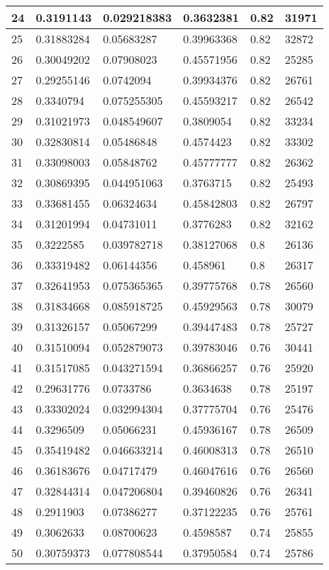\begin{longtable}{|l|l|l|l|l|l|}
24 & 0.3191143 & 0.029218383 & 0.3632381 & 0.82 & 31971 \\ \hline 
25 & 0.31883284 & 0.05683287 & 0.39963368 & 0.82 & 32872 \\ \hline 
26 & 0.30049202 & 0.07908023 & 0.45571956 & 0.82 & 25285 \\ \hline 
27 & 0.29255146 & 0.0742094 & 0.39934376 & 0.82 & 26761 \\ \hline 
28 & 0.3340794 & 0.075255305 & 0.45593217 & 0.82 & 26542 \\ \hline 
29 & 0.31021973 & 0.048549607 & 0.3809054 & 0.82 & 33234 \\ \hline 
30 & 0.32830814 & 0.05486848 & 0.4574423 & 0.82 & 33302 \\ \hline 
31 & 0.33098003 & 0.05848762 & 0.45777777 & 0.82 & 26362 \\ \hline 
32 & 0.30869395 & 0.044951063 & 0.3763715 & 0.82 & 25493 \\ \hline 
33 & 0.33681455 & 0.06324634 & 0.45842803 & 0.82 & 26797 \\ \hline 
34 & 0.31201994 & 0.04731011 & 0.3776283 & 0.82 & 32162 \\ \hline 
35 & 0.3222585 & 0.039782718 & 0.38127068 & 0.8 & 26136 \\ \hline 
36 & 0.33319482 & 0.06144356 & 0.458961 & 0.8 & 26317 \\ \hline 
37 & 0.32641953 & 0.075365365 & 0.39775768 & 0.78 & 26560 \\ \hline 
38 & 0.31834668 & 0.085918725 & 0.45929563 & 0.78 & 30079 \\ \hline 
39 & 0.31326157 & 0.05067299 & 0.39447483 & 0.78 & 25727 \\ \hline 
40 & 0.31510094 & 0.052879073 & 0.39783046 & 0.76 & 30441 \\ \hline 
41 & 0.31517085 & 0.043271594 & 0.36866257 & 0.76 & 25920 \\ \hline 
42 & 0.29631776 & 0.0733786 & 0.3634638 & 0.78 & 25197 \\ \hline 
43 & 0.33302024 & 0.032994304 & 0.37775704 & 0.76 & 25476 \\ \hline 
44 & 0.3296509 & 0.05066231 & 0.45936167 & 0.78 & 26509 \\ \hline 
45 & 0.35419482 & 0.046633214 & 0.46008313 & 0.78 & 26510 \\ \hline 
46 & 0.36183676 & 0.04717479 & 0.46047616 & 0.76 & 26560 \\ \hline 
47 & 0.32844314 & 0.047206804 & 0.39460826 & 0.76 & 26341 \\ \hline 
48 & 0.2911903 & 0.07386277 & 0.37122235 & 0.76 & 25761 \\ \hline 
49 & 0.3062633 & 0.08700623 & 0.4598587 & 0.74 & 25855 \\ \hline 
50 & 0.30759373 & 0.077808544 & 0.37950584 & 0.74 & 25786 \\ \hline 
\end{longtable}